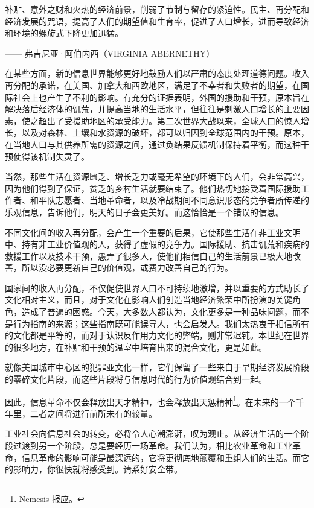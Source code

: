 \begin{tcolorbox}
\kaishu 补贴、意外之财和火热的经济前景，削弱了节制与留存的紧迫性。民主、再分配和经济发展的咒语，提高了人们的期望值和生育率，促进了人口增长，进而导致经济和环境的螺旋式下降更加迅猛。
\begin{flushright}
—— 弗吉尼亚·阿伯内西（VIRGINIA ABERNETHY）
\end{flushright}
\end{tcolorbox}

在某些方面，新的信息世界能够更好地鼓励人们以严肃的态度处理道德问题。收入再分配的承诺，在美国、加拿大和西欧地区，满足了不幸者和失败者的期望，在国际社会上也产生了不利的影响。有充分的证据表明，外国的援助和干预，原本旨在解决落后经济体的饥荒，并提高当地的生活水平，但往往是刺激人口增长的主要因素，使之超出了受援助地区的承受能力。第二次世界大战以来，全球人口的惊人增长，以及对森林、土壤和水资源的破坏，都可以归因到全球范围内的干预。原本，在当地人口与其供养所需的资源之间，通过负结果反馈机制保持着平衡，而这种干预使得该机制失灵了。

当然，那些生活在资源匮乏、增长乏力或毫无希望的环境下的人们，会非常高兴，因为他们得到了保证，贫乏的乡村生活就要结束了。他们热切地接受着国际援助工作者、和平队志愿者、当地革命者，以及冷战期间不同意识形态的竞争者所传递的乐观信息，告诉他们，明天的日子会更美好。而这恰恰是一个错误的信息。

不同文化间的收入再分配，会产生一个重要的后果，它使那些生活在非工业文明中、持有非工业价值观的人，获得了虚假的竞争力。国际援助、抗击饥荒和疾病的救援工作以及技术干预，愚弄了很多人，使他们相信自己的生活前景已极大地改善，所以没必要更新自己的价值观，或费力改善自己的行为。

国家间的收入再分配，不仅促使世界人口不可持续地激增，并以重要的方式助长了文化相对主义，而且，对于文化在影响人们创造当地经济繁荣中所扮演的关键角色，造成了普遍的困惑。今天，大多数人都认为，文化更多是一种品味问题，而不是行为指南的来源；这些指南既可能误导人，也会启发人。我们太热衷于相信所有的文化都是平等的，而对于认识反作用力文化的弊端，则非常迟钝。本世纪在世界的很多地方，在补贴和干预的温室中培育出来的混合文化，更是如此。

就像美国城市中心区的犯罪亚文化一样，它们保留了一些来自于早期经济发展阶段的零碎文化片段，而这些片段将与信息时代的行为价值观结合到一起。

因此，信息革命不仅会释放出天才精神，也会释放出天惩精神\footnote{Nemesis 报应。}。在未来的一个千年里，二者之间将进行前所未有的较量。

工业社会向信息社会的转变，必将令人心潮澎湃，叹为观止。从经济生活的一个阶段过渡到另一个阶段，总是要经历一场革命。我们认为，相比农业革命和工业革命，信息革命的影响可能是最深远的，它将更彻底地颠覆和重组人们的生活。而它的影响力，你很快就将感受到。请系好安全带。